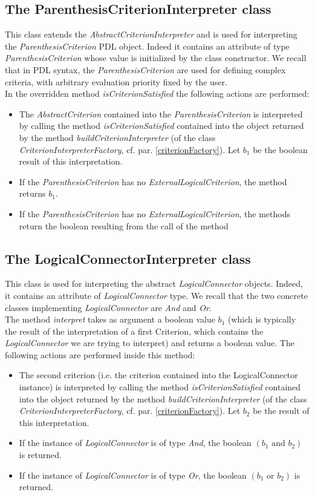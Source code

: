 \documentclass[a4paper,11pt] {ivoa}
\begin{document}
\subsection{The ParenthesisCriterionInterpreter class}
This class extends the {\it AbstractCriterionInterpreter} and is used for interpreting the {\it ParenthesisCriterion} PDL object. Indeed it contains an attribute of type {\it ParenthesisCriterion} whose value is initialized by the class constructor. We recall that in PDL syntax, the {\it ParenthesisCriterion} are used for defining complex criteria, with arbitrary evaluation priority fixed by the user. \\
In the overridden method {\it isCriterionSatisfied} the following actions are performed:
\begin{itemize}
\item The {\it AbstractCriterion} contained into the {\it ParenthesisCriterion} is interpreted  by calling the method {\it isCriterionSatisfied} contained into the object returned by the method {\it buildCriterionInterpreter} (of the class {\it CriterionInterpreterFactory}, cf. par. \ref{criterionFactory}). Let $b_1$ be the boolean result of this interpretation.
\item If the {\it ParenthesisCriterion} has no {\it ExternalLogicalCriterion}, the method returns $b_1$.
\item If the {\it ParenthesisCriterion} has no {\it ExternalLogicalCriterion}, the methods return the boolean resulting from the call of the method 
\end{itemize}

\subsection{The LogicalConnectorInterpreter class}\label{logicalConnectorInt}
This class is used for interpreting the abstract {\it LogicalConnector} objects. Indeed, it contains an attribute of {\it LogicalConnector} type. We recall that the two concrete classes implementing {\it LogicalConnector} are {\it And} and {\it Or}.\\
The method {\it interpret} takes as argument a boolean value $b_1$ (which is  typically the result of the interpretation of a first Criterion, which contains the {\it LogicalConnector} we are trying to interpret) and returns a boolean value. The following actions are performed inside this method:
\begin{itemize}
\item The second criterion (i.e. the criterion contained into the {LogicalConnector} instance) is interpreted by calling the method {\it isCriterionSatisfied} contained into the object returned by the method {\it buildCriterionInterpreter} (of the class {\it CriterionInterpreterFactory}, cf. par. \ref{criterionFactory}). Let $b_2$ be the result of this interpretation.
\item If the instance of {\it LogicalConnector} is of type {\it And}, the boolean $(b_1 \mbox{ and } b_2)$ is returned.
\item If the instance of {\it LogicalConnector} is of type {\it Or}, the boolean $(b_1 \mbox{ or } b_2)$ is returned.
\end{itemize}
\end{document}
